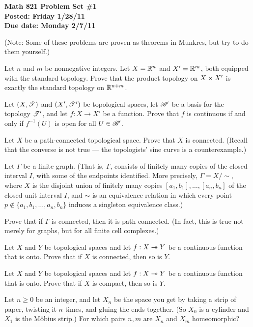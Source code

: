 

\thispagestyle{empty}
{\bf Math 821 Problem Set \#1\\
Posted: Friday 1/28/11\\
Due date: Monday 2/7/11}

(Note: Some of these problems are proven as theorems in Munkres,
but try to do them yourself.)

\prob
Let $n$ and $m$ be nonnegative integers.  Let $X=\mathbb{R}^n$ and $X'=\mathbb{R}^m$, both equipped
with the standard topology.  Prove that the product topology on $X\times X'$
is exactly the standard topology on $\mathbb{R}^{n+m}$.

\prob
Let $(X,\mathscr{T})$ and $(X',\mathscr{T}')$ be topological spaces,
let $\mathscr{B}'$ be a basis for the topology $\mathscr{T}'$,
and let $f:X\to X'$ be a function.  Prove that
$f$ is continuous if and only if $f^{-1}(U)$ is open 
for all $U\in\mathscr{B}'$.

\prob
Let $X$ be a path-connected topological space.
Prove that $X$ is connected.  (Recall that the
converse is not true --- the topologists' sine curve
is a counterexample.)

\prob Let $\Gamma$ be a finite graph.  (That is,
$\Gamma$, consists of finitely many copies of the closed interval
$I$, with some of the endpoints identified.
More precisely, $\Gamma=X/\sim$, where $X$ is the disjoint union of
finitely many copies $[a_1,b_1],\dots,[a_n,b_n]$ of
the closed unit interval $I$, and $\sim$ is an equivalence
relation in which every point $p\not\in\{a_1,b_1,\dots,a_n,b_n\}$
induces a singleton equivalence class.)

Prove that if $\Gamma$
is connected, then it is path-connected.  (In fact, this is true not merely
for graphs, but for all finite cell complexes.)

\prob Let $X$ and $Y$ be topological spaces and
let $f:X\twoheadrightarrow Y$ be a continuous function that is onto.
Prove that if $X$ is connected, then so is $Y$.

\prob Let $X$ and $Y$ be topological spaces and
let $f:X\twoheadrightarrow Y$ be a continuous function that is onto.
Prove that if $X$ is compact, then so is $Y$.

\prob Let $n\geq 0$ be an integer, and let $X_n$ be the 
space you get by taking a strip of paper, twisting it $n$
times, and gluing the ends together.  (So $X_0$ is
a cylinder and $X_1$ is the M\"obius strip.)  For which
pairs $n,m$ are $X_n$ and $X_m$ homeomorphic?


